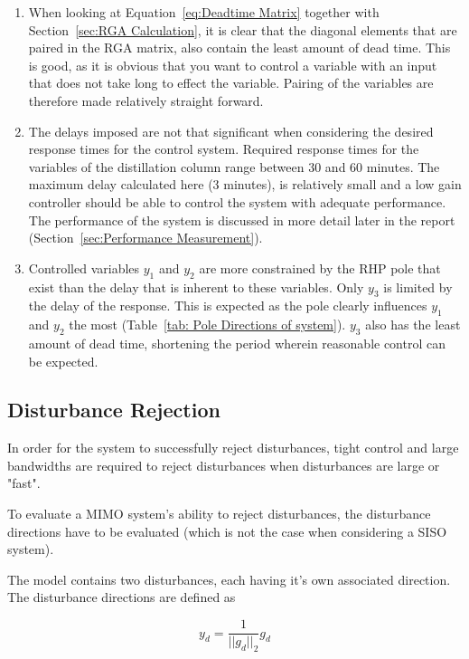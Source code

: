 \begin{enumerate}
	\item When looking at Equation~\ref{eq:Deadtime Matrix} together with Section~\ref{sec:RGA Calculation}, it is clear that the diagonal elements that are paired in the RGA matrix, also contain the least amount of dead time. This is good, as it is obvious that you want to control a variable with an input that does not take long to effect the variable. Pairing of the variables are therefore made relatively straight forward.
	\item The delays imposed are not that significant when considering the desired response times for the control system. Required response times for the variables of the distillation column range between 30 and 60 minutes. The maximum delay calculated here (3 minutes), is relatively small and a low gain controller should be able to control the system with adequate performance. The performance of the system is discussed in more detail later in the report (Section~\ref{sec:Performance Measurement}).
	\item Controlled variables $y_1$ and $y_2$ are more constrained by the RHP pole that exist than the delay that is inherent to these variables. Only $y_3$ is limited by the delay of the response. This is expected as the pole clearly influences $y_1$ and $y_2$ the most (Table~\ref{tab: Pole Directions of system}). $y_3$ also has the least amount of dead time, shortening the period wherein reasonable control can be expected.
\end{enumerate}

\subsection{Disturbance Rejection}
\label{sec:Disturbance Rejection Analysis}
In order for the system to successfully reject disturbances, tight control and large bandwidths are required to reject disturbances when disturbances are large or "fast". 

To evaluate a MIMO system's ability to reject disturbances, the disturbance directions have to be evaluated (which is not the case when considering a SISO system). 

The model contains two disturbances, each having it's own associated direction. The disturbance directions are defined as

\begin{equation}
	\label{eq:gd equation}
	y_d = \frac{1}{||g_d||_2}g_d
\end{equation}

